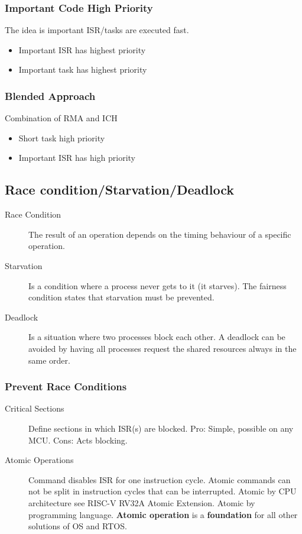 \subsubsection{Important Code High Priority}
The idea is important ISR/tasks are executed fast.
\begin{itemize}
  \item Important ISR has highest priority
  \item Important task has highest priority
\end{itemize}

\subsubsection{Blended Approach}
Combination of RMA and ICH
\begin{itemize}
  \item Short task high priority
  \item Important ISR has high priority
\end{itemize}

\subsection{Race condition/Starvation/Deadlock}
\begin{description}
  \item[Race Condition]  The result of an operation depends on the timing behaviour of a specific operation.
  \item[Starvation]      Is a condition where a process never gets to it (it starves).
        The fairness condition states that starvation must be prevented.
  \item[Deadlock]        Is a situation where two processes block each other.
        A deadlock can be avoided by having all processes request the shared resources always in the same order.
\end{description}

\subsubsection{Prevent Race Conditions}
\begin{description}
  \item[Critical Sections] Define sections in which ISR(s) are blocked.
        Pro: Simple, possible on any MCU.
        Cons: Acts blocking.
  \item[Atomic Operations] Command disables ISR for one instruction cycle.
        Atomic commands can not be split in instruction cycles that can be interrupted.
        Atomic by CPU architecture see RISC-V RV32A Atomic Extension.
        Atomic by programming language.
        \textbf{Atomic operation} is a \textbf{foundation} for all other solutions of OS and RTOS.
\end{description}


